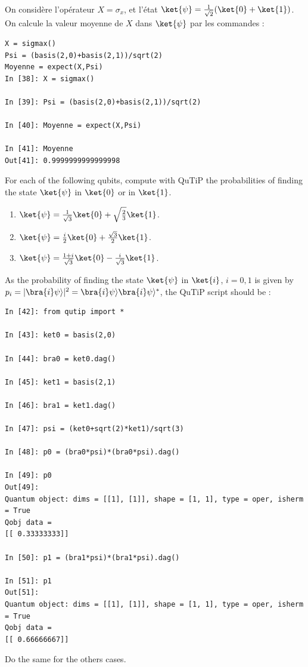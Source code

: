 \begin{example}
On considère l'opérateur $X=\sigma_x$, et l'état 
$\ket{\psi}=\frac{1}{\sqrt{2}}(\ket{0}+\ket{1})$. On calcule la valeur moyenne 
de $X$ dans $\ket{\psi}$ par les commandes :
\end{example}
\begin{lstlisting}
X = sigmax()
Psi = (basis(2,0)+basis(2,1))/sqrt(2)
Moyenne = expect(X,Psi)
In [38]: X = sigmax()

In [39]: Psi = (basis(2,0)+basis(2,1))/sqrt(2)

In [40]: Moyenne = expect(X,Psi)

In [41]: Moyenne
Out[41]: 0.9999999999999998
\end{lstlisting}

\begin{exercise}
For each of the following qubits, compute with QuTiP the probabilities of 
finding the state $\ket{\psi}$ in $\ket{0}$ or in $\ket{1}$.
\begin{enumerate}
 \item $\ket{\psi}=\frac{1}{\sqrt{3}}\ket{0}+\sqrt{\frac{2}{3}}\ket{1}$.
 \item $\ket{\psi}=\frac{i}{2}\ket{0}+\frac{\sqrt{3}}{2}\ket{1}$.
 \item $\ket{\psi}=\frac{1+i}{\sqrt{3}}\ket{0}-\frac{i}{\sqrt{3}}\ket{1}$.
\end{enumerate}
\end{exercise}

\begin{footnotesize}
\begin{solution}
 As the probability of finding the state $\ket{\psi}$ in $\ket{i}$, $i=0,1$ is 
given by $p_i=|\bra{i}\psi\rangle|^2=\bra{i}\psi\rangle\bra{i}\psi\rangle^*$, 
the QuTiP script should be : 
\end{solution}
\end{footnotesize}
\begin{lstlisting}
In [42]: from qutip import *

In [43]: ket0 = basis(2,0)

In [44]: bra0 = ket0.dag()

In [45]: ket1 = basis(2,1)

In [46]: bra1 = ket1.dag()

In [47]: psi = (ket0+sqrt(2)*ket1)/sqrt(3) 

In [48]: p0 = (bra0*psi)*(bra0*psi).dag()

In [49]: p0
Out[49]: 
Quantum object: dims = [[1], [1]], shape = [1, 1], type = oper, isherm = True
Qobj data =
[[ 0.33333333]]

In [50]: p1 = (bra1*psi)*(bra1*psi).dag()

In [51]: p1
Out[51]: 
Quantum object: dims = [[1], [1]], shape = [1, 1], type = oper, isherm = True
Qobj data =
[[ 0.66666667]]
\end{lstlisting}
Do the same for the others cases.

